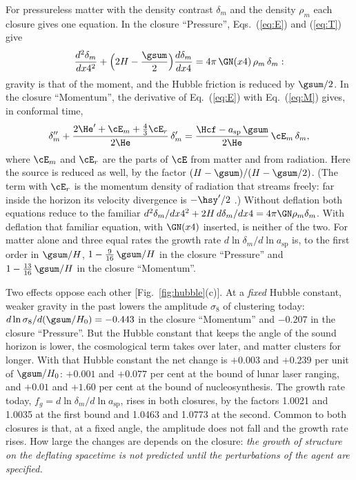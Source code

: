 For pressureless matter with the density contrast $\delta_m$ and the density $\rho_m$ each closure
gives one equation. In the closure ``Pressure'', Eqs.~(\ref{eq:E}) and (\ref{eq:T}) give
\begin{equation}
\frac{d^{2}\delta_m}{dx4^{2}}+\Big(2H-\frac{\gsum}{2}\Big)\frac{d\delta_m}{dx4}=4\pi\,\GN(x4)\,\rho_m\,\delta_m :
\label{eq:growthP}
\end{equation}
gravity is that of the moment, and the Hubble friction is reduced by $\gsum/2$. In the closure
``Momentum'', the derivative of Eq.~(\ref{eq:E}) with Eq.~(\ref{eq:M}) gives, in conformal time,
\begin{equation}
\delta_m''+\frac{2\He'+\cE_m+\tfrac43\cE_r}{2\He}\,\delta_m'=\frac{\Hcf-a_{\mathrm{sp}}\,\gsum}{2\He}\,\cE_m\,\delta_m ,
\label{eq:growthM}
\end{equation}
where $\cE_m$ and $\cE_r$ are the parts of $\cE$ from matter and from radiation. Here the source is
reduced as well, by the factor $(H-\gsum)/(H-\gsum/2)$. (The term with $\cE_r$ is the momentum
density of radiation that streams freely: far inside the horizon its velocity divergence is
$-\hsy'/2$ \cite{MaBertschinger1995}.) Without deflation both equations reduce to the familiar
$d^{2}\delta_m/dx4^{2}+2H\,d\delta_m/dx4=4\pi\GN\rho_m\delta_m$. With deflation that familiar
equation, with $\GN(x4)$ inserted, is neither of the two. For matter alone and three equal rates the
growth rate $d\ln\delta_m/d\ln a_{\mathrm{sp}}$ is, to the first order in $\gsum/H$,
$1-\tfrac{9}{16}\,\gsum/H$ in the closure ``Pressure'' and $1-\tfrac{13}{16}\,\gsum/H$ in the closure
``Momentum''.

Two effects oppose each other [Fig.~\ref{fig:hubble}(c)]. At a \emph{fixed} Hubble constant, weaker
gravity in the past lowers the amplitude $\sigma_8$ of clustering today:
$d\ln\sigma_8/d(\gsum/H_0)=-0.443$ in the closure ``Momentum'' and $-0.207$ in the closure
``Pressure''. But the Hubble constant that keeps the angle of the sound horizon is lower, the
cosmological term takes over later, and matter clusters for longer. With that Hubble constant the net
change is $+0.003$ and $+0.239$ per unit of $\gsum/H_0$: $+0.001$ and $+0.077$ per cent at the bound
of lunar laser ranging, and $+0.01$ and $+1.60$ per cent at the bound of nucleosynthesis. The growth
rate today, $f_g=d\ln\delta_m/d\ln a_{\mathrm{sp}}$, rises in both closures, by the factors 1.0021
and 1.0035 at the first bound and 1.0463 and 1.0773 at the second. Common to both closures is that,
at a fixed angle, the amplitude does not fall and the growth rate rises. How large the changes are
depends on the closure: \emph{the growth of structure on the deflating spacetime is not predicted
until the perturbations of the agent are specified.}

